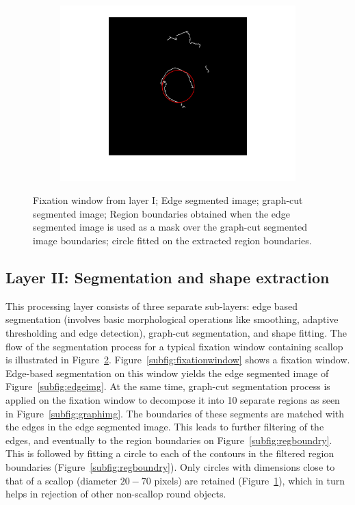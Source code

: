 \documentclass {udthesis}
\begin{document}
\begin{figure}
\begin{subfigure}[]{0.17\textwidth}
      \includegraphics[width=\textwidth,natwidth=810,natheight=813]{regcircle.pdf}         
      \caption{}
      \label{subfig:regcircle}
  \end{subfigure}
\caption[Segmentation layer process flow]{ Fixation window from layer I;  Edge segmented image;  graph-cut segmented image;  Region boundaries obtained when the edge segmented image is used as a mask over the graph-cut segmented image boundaries;  circle fitted on the extracted region boundaries.
}
\label{fig:segmentation_levels}
\end{figure}


\subsection{Layer II: Segmentation and shape extraction}
\label{subsec:layer2}

This processing layer consists of
three separate sub-layers: edge based segmentation (involves basic morphological 
operations like smoothing, adaptive thresholding and edge detection), graph-cut 
segmentation, and shape fitting. 
The flow of the segmentation process for a typical fixation window containing  scallop is illustrated in Figure~\ref{fig:segmentation_levels}. 
Figure~\ref{subfig:fixationwindow} shows a fixation window.
Edge-based segmentation on this window yields the edge segmented image of Figure~\ref{subfig:edgeimg}.
At the same time, graph-cut segmentation process \cite{shi} is applied on the 
fixation window to decompose it into 10 separate regions
as seen in Figure~\ref{subfig:graphimg}. The boundaries of these
segments are matched with the edges in the edge segmented image.
This leads to further filtering of the edges, and eventually to the region boundaries
on Figure~\ref{subfig:regboundry}.
This is followed by fitting a circle to 
each of the contours in the filtered region boundaries (Figure~\ref{subfig:regboundry}). 
Only circles with dimensions close to that of a scallop (diameter $20 - 70$ pixels) 
are retained (Figure~\ref{subfig:regcircle}), which in turn helps in rejection of other 
non-scallop round objects.
\end{document}
